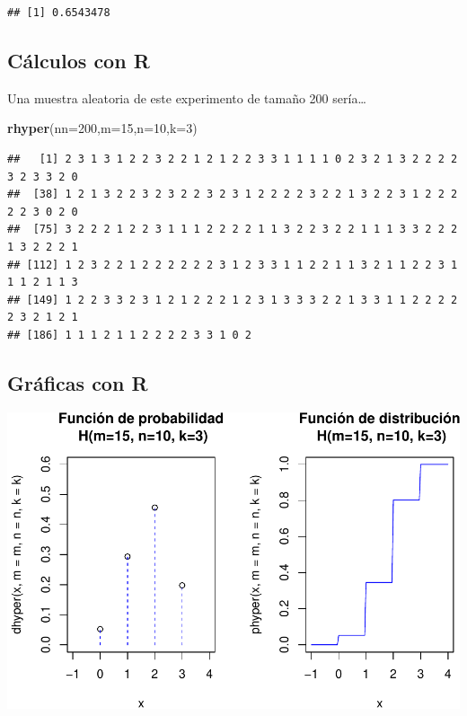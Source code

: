 \documentclass[]{book}
\newenvironment{Shaded}{\begin{snugshade}}{\end{snugshade}}
\newcommand{\DataTypeTok}[1]{\textcolor[rgb]{0.13,0.29,0.53}{#1}}
\newcommand{\DecValTok}[1]{\textcolor[rgb]{0.00,0.00,0.81}{#1}}
\newcommand{\KeywordTok}[1]{\textcolor[rgb]{0.13,0.29,0.53}{\textbf{#1}}}
\newcommand{\NormalTok}[1]{#1}
\begin{document}
\begin{verbatim}
## [1] 0.6543478
\end{verbatim}

\hypertarget{cuxe1lculos-con-r-12}{%
\subsection{Cálculos con R}\label{cuxe1lculos-con-r-12}}

Una muestra aleatoria de este experimento de tamaño 200 sería\ldots{}

\begin{Shaded}
\begin{Highlighting}[]
\KeywordTok{rhyper}\NormalTok{(}\DataTypeTok{nn=}\DecValTok{200}\NormalTok{,}\DataTypeTok{m=}\DecValTok{15}\NormalTok{,}\DataTypeTok{n=}\DecValTok{10}\NormalTok{,}\DataTypeTok{k=}\DecValTok{3}\NormalTok{)}
\end{Highlighting}
\end{Shaded}

\begin{verbatim}
##   [1] 2 3 1 3 1 2 2 3 2 2 1 2 1 2 2 3 3 1 1 1 1 0 2 3 2 1 3 2 2 2 2 3 2 3 3 2 0
##  [38] 1 2 1 3 2 2 3 2 3 2 2 3 2 3 1 2 2 2 2 3 2 2 1 3 2 2 3 1 2 2 2 2 2 3 0 2 0
##  [75] 3 2 2 2 1 2 2 3 1 1 1 2 2 2 2 1 1 3 2 2 3 2 2 1 1 1 3 3 2 2 2 1 3 2 2 2 1
## [112] 1 2 3 2 2 1 2 2 2 2 2 2 3 1 2 3 3 1 1 2 2 1 1 3 2 1 1 2 2 3 1 1 1 2 1 1 3
## [149] 1 2 2 3 3 2 3 1 2 1 2 2 2 1 2 3 1 3 3 3 2 2 1 3 3 1 1 2 2 2 2 2 3 2 1 2 1
## [186] 1 1 1 2 1 1 2 2 2 2 3 3 1 0 2
\end{verbatim}

\hypertarget{gruxe1ficas-con-r}{%
\subsection{Gráficas con R}\label{gruxe1ficas-con-r}}

\begin{center}\includegraphics{curso-probabilidad-udemy_files/figure-latex/unnamed-chunk-74-1} \end{center}
\end{document}
